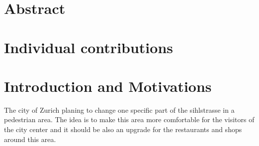 \documentclass[11pt]{article}
\begin{document}
\section{Abstract}

\section{Individual contributions}

\section{Introduction and Motivations}


The city of Zurich planing to change one specific part of the sihlstrasse in a pedestrian area. The idea is to make this area more comfortable for the visitors of the city center and it should be also an upgrade for the restaurants and shops around this area.
\end{document}
